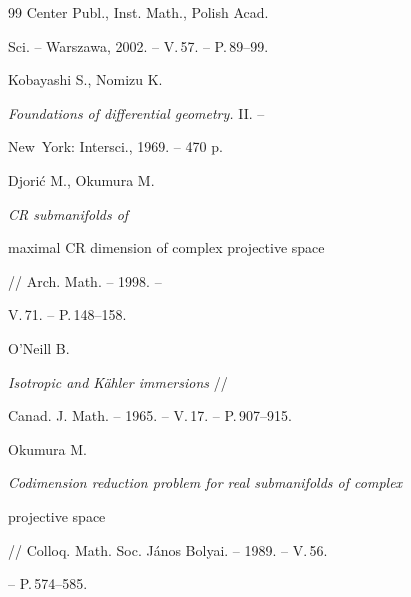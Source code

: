 \begin{thebibliography}{99}
Center Publ., Inst. Math., Polish Acad.


Sci. -- Warszawa, 2002. -- V.\,57. -- P.\,89--99.







Kobayashi S., Nomizu K.


{\em Foundations of differential geometry.} II. --


New~York: Intersci., 1969. -- 470 p.







Djori\'c M., Okumura M.


{\em CR submanifolds of


maximal CR dimension of complex projective space} // Arch. Math. -- 1998. --


V.\,71. -- P.\,148--158.










O'Neill B.


{\em  Isotropic and K\"ahler immersions} //


Canad. J. Math. -- 1965. -- V.\,17. -- P.\,907--915.










Okumura M.


{\em Codimension reduction problem for real submanifolds of complex


projective space} // Colloq. Math. Soc. J\'anos Bolyai. -- 1989. -- V.\,56.


-- P.\,574--585.





\end{thebibliography}





\vskip 0.5cm












